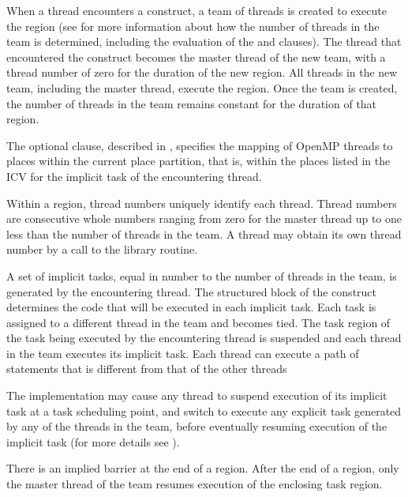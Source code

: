 \descr
When a thread encounters a  construct, a team of threads is created to
execute the  region (see
for more information about
how the number of threads in the team is determined, including the evaluation of the 
and  clauses). The thread that encountered the  construct
becomes the master thread of the new team, with a thread number of zero for the
duration of the new  region. All threads in the new team, including the
master thread, execute the region. Once the team is created, the number of threads in the
team remains constant for the duration of that  region.

The optional  clause, described in
, specifies the
mapping of OpenMP threads to places within the current place partition, that is, within
the places listed in the  ICV for the implicit task of the encountering
thread.

Within a  region, thread numbers uniquely identify each thread. Thread
numbers are consecutive whole numbers ranging from zero for the master thread up to
one less than the number of threads in the team. A thread may obtain its own thread
number by a call to the  library routine.

A set of implicit tasks, equal in number to the number of threads in the team, is
generated by the encountering thread. The structured block of the  construct
determines the code that will be executed in each implicit task. Each task is assigned to
a different thread in the team and becomes tied. The task region of the task being
executed by the encountering thread is suspended and each thread in the team executes
its implicit task. Each thread can execute a path of statements that is different from that
of the other threads

The implementation may cause any thread to suspend execution of its implicit task at a
task scheduling point, and switch to execute any explicit task generated by any of the
threads in the team, before eventually resuming execution of the implicit task (for more
details see ).

There is an implied barrier at the end of a  region. After the end of a
 region, only the master thread of the team resumes execution of the
enclosing task region.

